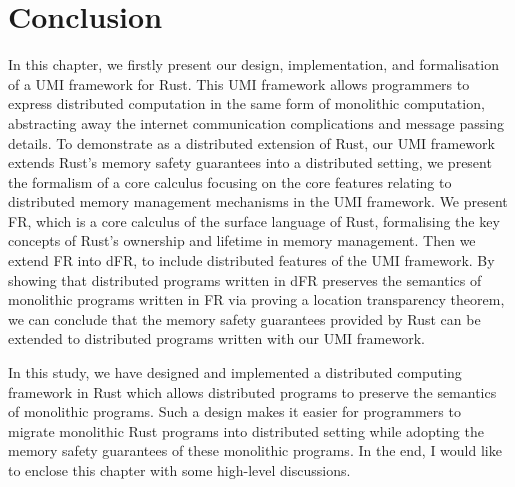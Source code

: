 
\section{Conclusion}
\label{chap3:conclusion}
In this chapter, we firstly present our design, implementation, and formalisation of a UMI framework for Rust. This UMI framework allows programmers to express distributed computation in the same form of monolithic computation, abstracting away the internet communication complications and message passing details. To demonstrate as a distributed extension of Rust, our UMI framework extends Rust's memory safety guarantees into a distributed setting, we present the formalism of a core calculus focusing on the core features relating to distributed memory management mechanisms in the UMI framework. We present FR, which is a core calculus of the surface language of Rust, formalising the key concepts of Rust's ownership and lifetime in memory management. Then we extend FR into dFR, to include distributed features of the UMI framework. By showing that distributed programs written in dFR preserves the semantics of monolithic programs written in FR via proving a location transparency theorem, we can conclude that the memory safety guarantees provided by Rust can be extended to distributed programs written with our UMI framework.

\noindent
\begin{center}
\vspace{0.3em}
\vspace{-0.7em}
\end{center}
In this study, we have designed and implemented a distributed computing framework in Rust which allows distributed programs to preserve the semantics of monolithic programs. Such a design makes it easier for programmers to migrate monolithic Rust programs into distributed setting while adopting the memory safety guarantees of these monolithic programs. In the end, I would like to enclose this chapter with some high-level discussions.

